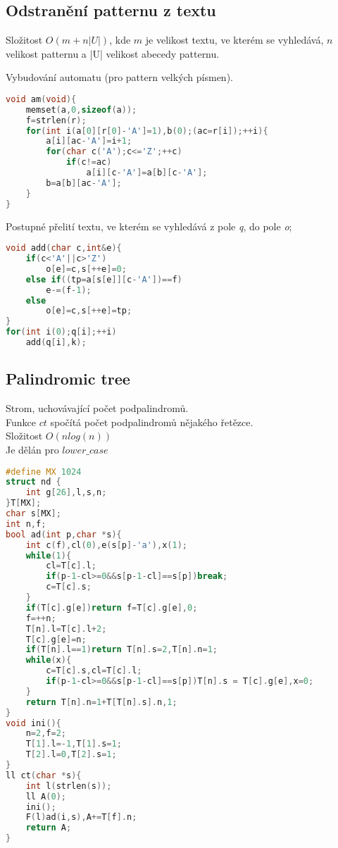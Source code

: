 \documentclass[11pt]{article}
\begin{document}
\subsection{Odstranění patternu z textu}
Složitost $O(m+n|U|)$, kde $m$ je velikost textu, ve kterém se vyhledává, $n$ velikost patternu a |U| velikost abecedy patternu.
\begin{center}
Vybudování automatu (pro pattern velkých písmen).
\end{center}
\begin{lstlisting}[language=C++]
void am(void){
    memset(a,0,sizeof(a));
    f=strlen(r);
    for(int i(a[0][r[0]-'A']=1),b(0);(ac=r[i]);++i){
        a[i][ac-'A']=i+1;
        for(char c('A');c<='Z';++c)
            if(c!=ac)
                a[i][c-'A']=a[b][c-'A'];
        b=a[b][ac-'A'];
    }
}
\end{lstlisting}
\begin{center}
Postupné přelití textu, ve kterém se vyhledává z pole \textit{q}, do pole \textit{o};
\end{center}
\begin{lstlisting}[language=C++]
void add(char c,int&e){
    if(c<'A'||c>'Z')
        o[e]=c,s[++e]=0;
    else if((tp=a[s[e]][c-'A'])==f)
        e-=(f-1);
    else
        o[e]=c,s[++e]=tp;
}
for(int i(0);q[i];++i)
	add(q[i],k);
\end{lstlisting}
\subsection{Palindromic tree}
Strom, uchovávající počet podpalindromů.
\\Funkce $ct$ spočítá počet podpalindromů nějakého řetězce.
\\Složitost $O(nlog(n))$
\\Je dělán pro $lower\_case$
\begin{lstlisting}[language=C++]
#define MX 1024
struct nd {
    int g[26],l,s,n;
}T[MX];
char s[MX];
int n,f;
bool ad(int p,char *s){
    int c(f),cl(0),e(s[p]-'a'),x(1);
    while(1){
        cl=T[c].l;
        if(p-1-cl>=0&&s[p-1-cl]==s[p])break;
        c=T[c].s;
    }
    if(T[c].g[e])return f=T[c].g[e],0;
    f=++n;
    T[n].l=T[c].l+2;
    T[c].g[e]=n;
    if(T[n].l==1)return T[n].s=2,T[n].n=1;
    while(x){
        c=T[c].s,cl=T[c].l;
        if(p-1-cl>=0&&s[p-1-cl]==s[p])T[n].s = T[c].g[e],x=0;
    }       
    return T[n].n=1+T[T[n].s].n,1;
}
void ini(){
    n=2,f=2;
    T[1].l=-1,T[1].s=1;
    T[2].l=0,T[2].s=1;
}
ll ct(char *s){
    int l(strlen(s));
    ll A(0);
    ini();
    F(l)ad(i,s),A+=T[f].n;
    return A;
}
\end{lstlisting}
\end{document}
